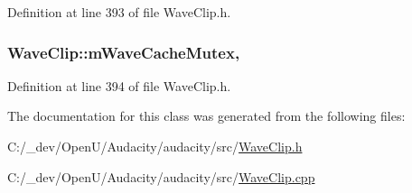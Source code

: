 Definition at line 393 of file Wave\+Clip.\+h.

\subsubsection[{\texorpdfstring{m\+Wave\+Cache\+Mutex}{mWaveCacheMutex}}]{ Wave\+Clip\+::m\+Wave\+Cache\+Mutex\hspace{0.3cm}{\ttfamily [mutable]}, {\ttfamily [protected]}}\hypertarget{class_wave_clip_ace99287e9c907db79cecfe223f27d470}{}\label{class_wave_clip_ace99287e9c907db79cecfe223f27d470}


Definition at line 394 of file Wave\+Clip.\+h.



The documentation for this class was generated from the following files\+:\begin{DoxyCompactItemize}
\item 
C\+:/\+\_\+dev/\+Open\+U/\+Audacity/audacity/src/\hyperlink{_wave_clip_8h}{Wave\+Clip.\+h}\item 
C\+:/\+\_\+dev/\+Open\+U/\+Audacity/audacity/src/\hyperlink{_wave_clip_8cpp}{Wave\+Clip.\+cpp}\end{DoxyCompactItemize}
